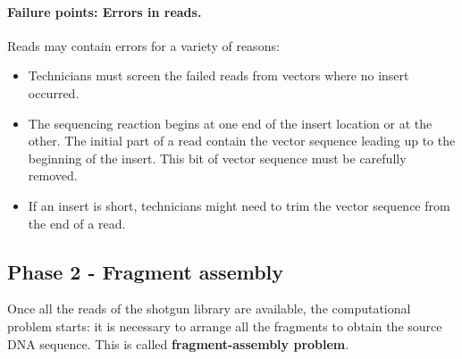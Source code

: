 \paragraph*{Failure points: Errors in reads.} Reads may contain errors for a variety of reasons: 
\begin{itemize}
	\item Technicians must screen the failed reads from vectors where no insert occurred.
	\item The sequencing reaction begins at one end of the insert location or at the other. The initial part of a read contain the vector sequence leading up to the beginning of the insert. This bit of vector sequence must be carefully removed.
	\item If an insert is short, technicians might need to trim the vector sequence from the end of a read.
\end{itemize}  

\subsection{Phase 2 - Fragment assembly}
Once all the reads of the shotgun library are available, the computational problem starts: it is necessary to arrange all the fragments to obtain the source DNA sequence. This is called \textbf{fragment-assembly problem}.


